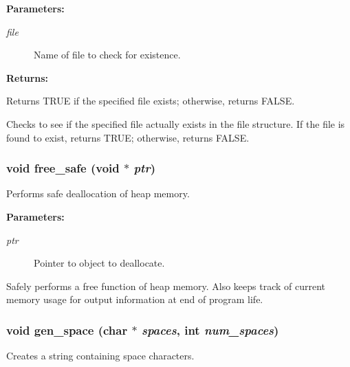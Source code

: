 \begin{Desc}
\item[{\bf Parameters: }]\par
\begin{description}
\item[
{\em file}]Name of file to check for existence. \end{description}
\end{Desc}
\begin{Desc}
\item[{\bf Returns: }]\par
Returns TRUE if the specified file exists; otherwise, returns FALSE.

\end{Desc}
Checks to see if the specified file actually exists in the file structure. If the file is found to exist, returns TRUE; otherwise, returns FALSE. 
\subsubsection{\setlength{\rightskip}{0pt plus 5cm}void free\_\-safe (void $\ast$ {\em ptr})}\label{util_8c_a20}


Performs safe deallocation of heap memory.

\begin{Desc}
\item[{\bf Parameters: }]\par
\begin{description}
\item[
{\em ptr}]Pointer to object to deallocate.

\end{description}
\end{Desc}
Safely performs a free function of heap memory. Also keeps track of current memory usage for output information at end of program life. 
\subsubsection{\setlength{\rightskip}{0pt plus 5cm}void gen\_\-space (char $\ast$ {\em spaces}, int {\em num\_\-spaces})}\label{util_8c_a21}


Creates a string containing space characters.

